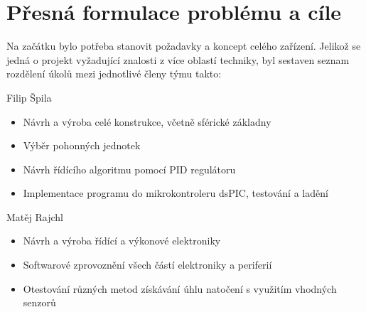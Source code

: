 \chapter{Přesná formulace problému a cíle}
\label{formulace}

Na začátku bylo potřeba stanovit požadavky a koncept celého zařízení. Jelikož se jedná o projekt vyžadující znalosti z více oblastí techniky, byl sestaven seznam rozdělení úkolů mezi jednotlivé členy týmu takto: \newline

\noindent Filip Špila

\begin{itemize}
\item Návrh a výroba celé konstrukce, včetně sférické základny
\item Výběr pohonných jednotek
\item Návrh řídícího algoritmu pomocí PID regulátoru
\item Implementace programu do mikrokontroleru dsPIC, testování a ladění

\end{itemize}

\noindent Matěj Rajchl

\begin{itemize}
\item Návrh a výroba řídící a výkonové elektroniky
\item Softwarové zprovoznění všech částí elektroniky a periferií
\item Otestování různých metod získávání úhlu natočení s využitím vhodných senzorů

\end{itemize}


\newpage